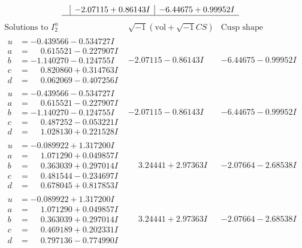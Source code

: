 \documentclass[1p]{elsarticle_modified}
\theoremstyle{definition}
\newcommand{\I}{\sqrt{-1}}
\begin{document}
$$\begin{array}{c|c|c}
 & -2.07115 + 0.86143 I & -6.44675 + 0.99952 I\\
 \hline 
 \end{array}$$\newpage$$\begin{array}{c|c|c}  
\text{Solutions to }I^u_{2}& \I (\text{vol} + \sqrt{-1}CS) & \text{Cusp shape}\\
 \hline 
\begin{aligned}
u &= -0.439566 - 0.534727 I \\
a &= \phantom{-}0.615521 - 0.227907 I \\
b &= -1.140270 - 0.124755 I \\
c &= \phantom{-}0.820860 + 0.314763 I \\
d &= \phantom{-}0.062069 - 0.407256 I\end{aligned}
 & -2.07115 - 0.86143 I & -6.44675 - 0.99952 I \\ \hline\begin{aligned}
u &= -0.439566 - 0.534727 I \\
a &= \phantom{-}0.615521 - 0.227907 I \\
b &= -1.140270 - 0.124755 I \\
c &= \phantom{-}0.487252 - 0.053221 I \\
d &= \phantom{-}1.028130 + 0.221528 I\end{aligned}
 & -2.07115 - 0.86143 I & -6.44675 - 0.99952 I \\ \hline\begin{aligned}
u &= -0.089922 + 1.317200 I \\
a &= \phantom{-}1.071290 + 0.049857 I \\
b &= \phantom{-}0.363039 + 0.297014 I \\
c &= \phantom{-}0.481544 - 0.234697 I \\
d &= \phantom{-}0.678045 + 0.817853 I\end{aligned}
 & \phantom{-}3.24441 + 2.97363 I & -2.07664 - 2.68538 I \\ \hline\begin{aligned}
u &= -0.089922 + 1.317200 I \\
a &= \phantom{-}1.071290 + 0.049857 I \\
b &= \phantom{-}0.363039 + 0.297014 I \\
c &= \phantom{-}0.469189 + 0.202331 I \\
d &= \phantom{-}0.797136 - 0.774990 I\end{aligned}
 & \phantom{-}3.24441 + 2.97363 I & -2.07664 - 2.68538 I \\ \hline\begin{aligned}

\end{aligned}
\end{array}$$
\end{document}

